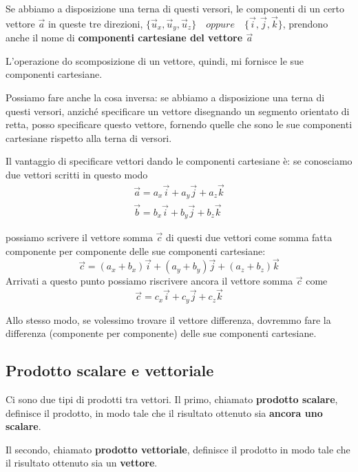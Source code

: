 Se abbiamo a disposizione una terna di questi versori, le componenti di un certo vettore $\overrightarrow{a}$ in queste tre direzioni, $\lbrace\overrightarrow{u}_{x}, \overrightarrow{u}_{y},  \overrightarrow{u}_{z}\rbrace \quad oppure \quad \lbrace \overrightarrow{i}, \overrightarrow{j}, \overrightarrow{k}\rbrace $, prendono anche il nome di \textbf{componenti cartesiane del vettore $\overrightarrow{a}$}

L'operazione do scomposizione di un vettore, quindi, mi fornisce le sue componenti cartesiane.

Possiamo fare anche la cosa inversa: se abbiamo a disposizione una terna di questi versori, anziché specificare un vettore disegnando un segmento orientato di retta, posso specificare questo vettore, fornendo quelle che sono le sue componenti cartesiane rispetto alla terna di versori.

Il vantaggio di specificare vettori dando le componenti cartesiane è: se conosciamo due vettori scritti in questo modo
\newpage
\begin{align*}
\overrightarrow{a} = a_{x} \overrightarrow{i} + a_{y} \overrightarrow{j} + a_{z} \overrightarrow{k} \\
 \overrightarrow{b} = b_{x} \overrightarrow{i} + b_{y} \overrightarrow{j} + b_{z} \overrightarrow{k}
\end{align*}
 
possiamo scrivere il vettore somma $\overrightarrow{c}$ di questi due vettori come somma fatta componente per componente delle sue componenti cartesiane:
$$ \overrightarrow{c} = (a_{x} + b_{x}) \overrightarrow{i} + (a_{y} + b_{y}) \overrightarrow{j} + (a_{z} + b_{z}) \overrightarrow{k} $$
Arrivati a questo punto possiamo riscrivere ancora il vettore somma $\overrightarrow{c}$ come
$$ \overrightarrow{c} = c_{x} \overrightarrow{i} + c_{y} \overrightarrow{j} + c_{z} \overrightarrow{k} $$

Allo stesso modo,  se volessimo trovare il vettore differenza, dovremmo fare la differenza (componente per componente) delle sue componenti cartesiane.

\subsection{Prodotto scalare e vettoriale}
Ci sono due tipi di prodotti tra vettori. Il primo, chiamato \textbf{prodotto scalare}, definisce il prodotto, in modo tale che il risultato ottenuto sia \textbf{ancora uno scalare}.

Il secondo, chiamato \textbf{prodotto vettoriale}, definisce il prodotto in modo tale che il risultato ottenuto sia un \textbf{vettore}.

